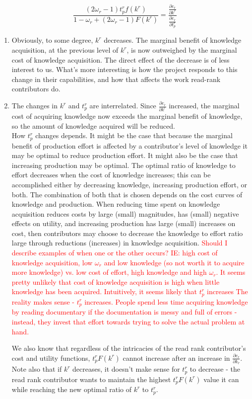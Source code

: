 \documentclass[source/paper/main.tex]{subfiles}
\begin{document}
$$\frac{(2\omega_r -1) t_p^r f(k^r)}{1 - \omega_r + (2 \omega_r -1)F(k^r)} = \frac{\frac{\partial c_r}{\partial k^r}}{\frac{\partial c_r}{\partial t_p^r}}$$
\begin{enumerate}
    \item Obviously, to some degree, $k^r$ decreases. The marginal benefit of knowledge acquisition, at the previous level of $k^r$, is now outweighed by the marginal cost of knowledge acquisition. The direct effect of the decrease is of less interest to us. What's more interesting is how the project responds to this change in their capabilities, and how that affects the work read-rank contributors do. 
    \item The changes in $k^r$ and $t_p^r$ are interrelated. Since $\frac{\partial c_r}{\partial k^r}$ increased, the marginal cost of acquiring knowledge now exceeds the marginal benefit of knowledge, so the amount of knowledge acquired will be reduced. \\
    
    How $t_p^r$ changes depends. It might be the case that because the marginal benefit of production effort is affected by a contributor's level of knowledge it may be optimal to reduce production effort. It might also be the case that increasing production may be optimal. The optimal ratio of knowledge to effort decreases when the cost of knowledge increases; this can be accomplished either by decreasing knowledge, increasing production effort, or both. The combination of both that is chosen depends on the cost curves of knowledge and production. When reducing time spent on knowledge acquisition reduces costs by large (small) magnitudes, has (small) negative effects on utility, and increasing production has large (small) increases on cost, then contributors may choose to decrease the knowledge to effort ratio large through reductions (increases) in knowledge acquisition. \textcolor{red}{Should I describe examples of when one or the other occurs? IE: high cost of knowledge acquisition, low $\omega_r$ and low knowledge (so not worth it to acquire more knowledge) vs. low cost of effort, high knowledge and high $\omega_r$. It seems pretty unlikely that cost of knowledge acquisition is high when little knowledge has been acquired. Intuitively, it seems likely that $t_p^r$ increases The reality makes sense - $t_p^r$ increases. People spend less time acquiring knowledge by reading documentary if the documentation is messy and full of errors - instead, they invest that effort towards trying to solve the actual problem at hand.}
    
    We also know that regardless of the intricacies of the read rank contributor's cost and utility functions, $t_p^rF(k^r)$ cannot increase after an increase in $\frac{\partial c_r}{\partial k_r}$. Note also that if $k^r$ decreases, it doesn't make sense for $t_p^r$ to decrease - the read rank contributor wants to maintain the highest $t_p^rF(k^r)$ value it can while reaching the new optimal ratio of $k^r$ to $t_p^r$. 
    
\end{enumerate}
\end{document}
